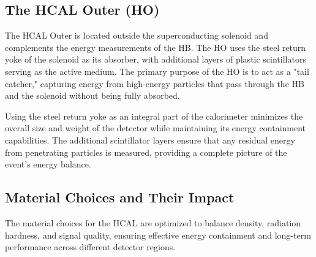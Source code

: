 \subsection{The HCAL Outer (HO)}
The HCAL Outer is located outside the superconducting solenoid and complements the energy measurements of the HB. The HO uses the steel return yoke of the solenoid as its absorber, with additional layers of plastic scintillators serving as the active medium. The primary purpose of the HO is to act as a "tail catcher," capturing energy from high-energy particles that pass through the HB and the solenoid without being fully absorbed.

Using the steel return yoke as an integral part of the calorimeter minimizes the overall size and weight of the detector while maintaining its energy containment capabilities. The additional scintillator layers ensure that any residual energy from penetrating particles is measured, providing a complete picture of the event's energy balance.~\cite{hcal_tdr_outer}



\subsection{Material Choices and Their Impact}
The material choices for the HCAL are optimized to balance density, radiation hardness, and signal quality, ensuring effective energy containment and long-term performance across different detector regions.

